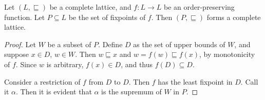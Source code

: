 \documentclass[9pt]{beamer}
\begin{document}
\begin{frame}
  \begin{theorem}
    Let $(L,\sqsubseteq)$ be a complete lattice, and $f : L \to L$ be an order-preserving function. Let $P \subseteq L$ be the set of fixpoints of $f$. Then $(P, \sqsubseteq)$ forms a complete lattice.
  \end{theorem}
  \begin{proof}
    Let $W$ be a subset of $P$.
    Define $D$ as the set of upper bounds of $W$, and suppose $x \in D$, $w \in W$.
    Then $w \sqsubseteq x$ and $w = f(w) \sqsubseteq f(x)$, by monotonicity of $f$.
    Since $w$ is arbitrary, $f(x) \in D$, and thus $f(D) \subseteq D$.

    Consider a restriction of $f$ from $D$ to $D$.
    Then $f$ has the least fixpoint in $D$. Call it $\alpha$.
    Then it is evident that $\alpha$ is the supremum of $W$ in $P$.
  \end{proof}
\end{frame}
\end{document}

